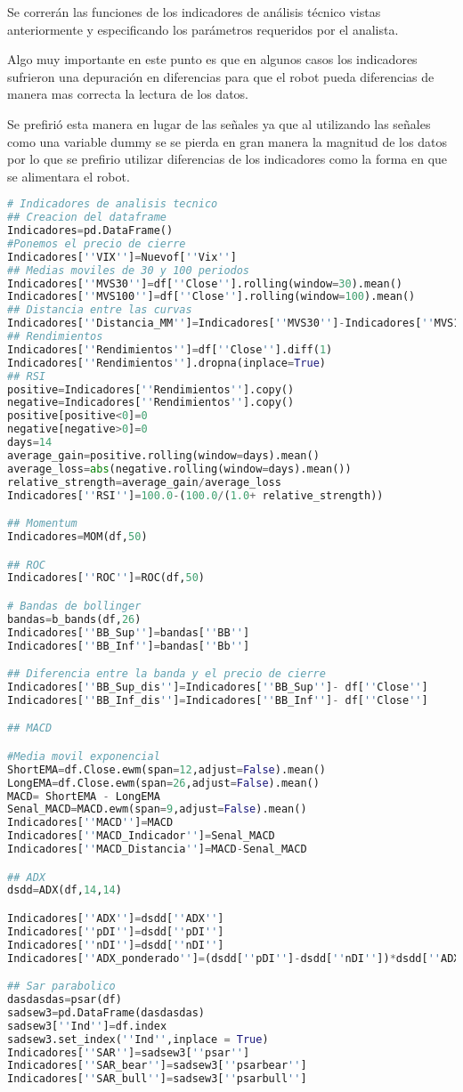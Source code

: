\documentclass[letterpaper,12pt,oneside]{book}
\begin{document}
Se correrán las funciones de los indicadores de análisis técnico vistas anteriormente y especificando los parámetros requeridos por el analista.


Algo muy importante en este punto es que en algunos casos los indicadores sufrieron una depuración en diferencias para que el robot pueda diferencias de manera mas correcta la lectura de los datos.

Se prefirió esta manera en lugar de las señales ya que al utilizando las señales como una variable dummy se se pierda en gran manera la magnitud de los datos por lo que se prefirio utilizar diferencias de los indicadores como la forma en que se alimentara el robot.

\begin{lstlisting}[language=Python]
# Indicadores de analisis tecnico
## Creacion del dataframe 
Indicadores=pd.DataFrame()
#Ponemos el precio de cierre
Indicadores[''VIX'']=Nuevof[''Vix'']
## Medias moviles de 30 y 100 periodos
Indicadores[''MVS30'']=df[''Close''].rolling(window=30).mean()
Indicadores[''MVS100'']=df[''Close''].rolling(window=100).mean()
## Distancia entre las curvas
Indicadores[''Distancia_MM'']=Indicadores[''MVS30'']-Indicadores[''MVS100'']
## Rendimientos
Indicadores[''Rendimientos'']=df[''Close''].diff(1)
Indicadores[''Rendimientos''].dropna(inplace=True)
## RSI
positive=Indicadores[''Rendimientos''].copy()
negative=Indicadores[''Rendimientos''].copy()
positive[positive<0]=0
negative[negative>0]=0
days=14
average_gain=positive.rolling(window=days).mean()
average_loss=abs(negative.rolling(window=days).mean())
relative_strength=average_gain/average_loss
Indicadores[''RSI'']=100.0-(100.0/(1.0+ relative_strength))

## Momentum
Indicadores=MOM(df,50)

## ROC
Indicadores[''ROC'']=ROC(df,50)

# Bandas de bollinger
bandas=b_bands(df,26)
Indicadores[''BB_Sup'']=bandas[''BB'']
Indicadores[''BB_Inf'']=bandas[''Bb'']

## Diferencia entre la banda y el precio de cierre
Indicadores[''BB_Sup_dis'']=Indicadores[''BB_Sup'']- df[''Close'']
Indicadores[''BB_Inf_dis'']=Indicadores[''BB_Inf'']- df[''Close'']

## MACD

#Media movil exponencial
ShortEMA=df.Close.ewm(span=12,adjust=False).mean()
LongEMA=df.Close.ewm(span=26,adjust=False).mean()
MACD= ShortEMA - LongEMA
Senal_MACD=MACD.ewm(span=9,adjust=False).mean()
Indicadores[''MACD'']=MACD
Indicadores[''MACD_Indicador'']=Senal_MACD
Indicadores[''MACD_Distancia'']=MACD-Senal_MACD

## ADX
dsdd=ADX(df,14,14)

Indicadores[''ADX'']=dsdd[''ADX'']
Indicadores[''pDI'']=dsdd[''pDI'']
Indicadores[''nDI'']=dsdd[''nDI'']
Indicadores[''ADX_ponderado'']=(dsdd[''pDI'']-dsdd[''nDI''])*dsdd[''ADX'']

## Sar parabolico
dasdasdas=psar(df)
sadsew3=pd.DataFrame(dasdasdas)
sadsew3[''Ind'']=df.index
sadsew3.set_index(''Ind'',inplace = True)
Indicadores[''SAR'']=sadsew3[''psar'']
Indicadores[''SAR_bear'']=sadsew3[''psarbear'']
Indicadores[''SAR_bull'']=sadsew3[''psarbull'']
\end{lstlisting}
\end{document}
